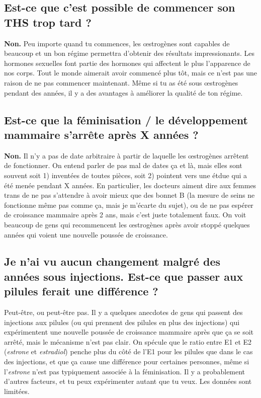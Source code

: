 \documentclass{article}
\begin{document}
\subsection{Est-ce que c'est possible de commencer son THS trop tard ?}\label{11-5}

\textbf{Non.} Peu importe quand tu commences, les œstrogènes sont capables de beaucoup et un bon régime permettra d'obtenir des résultats impressionants. Les hormones sexuelles font partie des hormones qui affectent le plus l'apparence de nos corps. Tout le monde aimerait avoir commencé plus tôt, mais ce n'est pas une raison de ne pas commencer maintenant. Même si tu as été sous œstrogènes pendant des années, il y a des avantages à améliorer la qualité de ton régime.

\subsection{Est-ce que la féminisation / le développement mammaire s'arrête après X années ?}\label{11-6}

\textbf{Non.} Il n'y a pas de date arbitraire à partir de laquelle les œstrogènes arrêtent de fonctionner. On entend parler de pas mal de dates ça et là, mais elles sont souvent soit 1) inventées de toutes pièces, soit 2) pointent vers une étdue qui a été menée pendant X années. En particulier, les docteurs aiment dire aux femmes trans de ne pas s'attendre à avoir mieux que des bonnet B (la mesure de seins ne fonctionne même pas comme ça, mais je m'écarte du sujet), ou de ne pas espérer de croissance mammaire après 2 ans, mais c'est juste totalement faux. On voit beaucoup de gens qui recommencent les œstrogènes après avoir stoppé quelques années qui voient une nouvelle poussée de croissance. 

\subsection{Je n'ai vu aucun changement malgré des années sous injections. Est-ce que passer aux pilules ferait une différence ?}

Peut-être, ou peut-être pas. Il y a quelques anecdotes de gens qui passent des injections aux pilules (ou qui prennent des pilules en plus des injections) qui expérimentent une nouvelle poussée de croissance mammaire après que ça se soit arrêté, mais le mécanisme n'est pas clair. On spécule que le ratio entre E1 et E2 (\textit{estrone} et \textit{estradiol}) penche plus du côté de l'E1 pour les pilules que dans le cas des injections, et que ça cause une différence pour certaines personnes, même si l'\textit{estrone} n'est pas typiquement associée à la féminisation. Il y a probablement d'autres facteurs, et tu peux expérimenter autant que tu veux. Les données sont limitées. 
\end{document}
